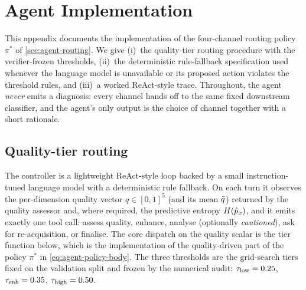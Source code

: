 
\section{Agent Implementation}\label{app:a5}

This appendix documents the implementation of the four-channel routing policy
$\pi^{*}$ of \cref{sec:agent-routing}. We give (i)~the quality-tier routing
procedure with the verifier-frozen thresholds, (ii)~the deterministic
rule-fallback specification used whenever the language model is unavailable or
its proposed action violates the threshold rules, and (iii)~a worked
ReAct-style trace. Throughout, the agent \emph{never} emits a diagnosis: every
channel hands off to the same fixed downstream classifier, and the agent's only
output is the choice of channel together with a short rationale.

\subsection{Quality-tier routing}\label{app:a5-routing}

The controller is a lightweight ReAct-style loop backed by a small
instruction-tuned language model with a deterministic rule fallback. On each
turn it observes the per-dimension quality vector $q\in[0,1]^5$ (and its mean
$\bar{q}$) returned by the quality assessor and, where required, the predictive
entropy $H(\hat{p}_x)$, and it emits exactly one tool call: assess quality,
enhance, analyse (optionally \emph{cautioned}), ask for re-acquisition, or
finalise. The core dispatch on the quality scalar is the tier function below,
which is the implementation of the quality-driven part of the policy
$\pi^{*}$ in \eqref{eq:agent-policy-body}. The three thresholds are the
grid-search tiers fixed on the validation split and frozen by the numerical
audit: $\tau_{\mathrm{low}}=0.25$, $\tau_{\mathrm{enh}}=0.35$, $\tau_{\mathrm{high}}=0.50$.

